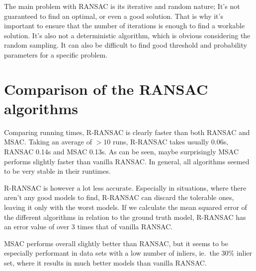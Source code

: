 The main problem with RANSAC is its iterative and random nature; It's not
guaranteed to find an optimal, or even a good solution. That is why it's
important to ensure that the number of iterations is enough to find a workable
solution. It's also not a deterministic algorithm, which is obvious considering
the random sampling.  It can also be difficult to find good threshold and
probability parameters for a specific problem.

\section{Comparison of the RANSAC algorithms}

Comparing running times, R-RANSAC is clearly faster than both RANSAC and MSAC\@.
Taking an average of \(>10\) runs, R-RANSAC takes usually 0.06s, RANSAC 0.14s and
MSAC 0.13s. As can be seen, maybe surprisingly MSAC performs slightly faster
than vanilla RANSAC\@. In general, all algorithms seemed to be very stable in
their runtimes.

R-RANSAC is however a lot less accurate. Especially in situations, where there
aren't any good models to find, R-RANSAC can discard the tolerable ones,
leaving it only with the worst models. If we calculate the mean squared error
of the different algorithms in relation to the ground truth model, R-RANSAC has
an error value of over 3 times that of vanilla RANSAC\@.

MSAC performs overall slightly better than RANSAC, but it seems to be
especially performant in data sets with a low number of inliers, ie.\ the 30\%
inlier set, where it results in much better models than vanilla RANSAC\@.







